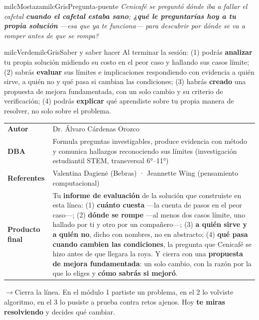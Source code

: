 \documentclass[11pt,letterpaper]{article}
\newcommand{\puente}[1]{%
  \begin{puentebox}%
    \textcolor{milcGradeDark}{$\rightarrow$}\hspace{2mm}#1%
  \end{puentebox}%
}
\begin{document}
\begin{softbox}{milcMostaza}{milcGris}{Pregunta-puente}
\textit{Cenicafé se preguntó dónde iba a fallar el cafetal \textbf{cuando el cafetal estaba sano}; \textbf{¿qué le preguntarías hoy a tu propia solución} ---esa que ya te funciona--- para descubrir por dónde se va a romper antes de que se rompa?}
\end{softbox}

\begin{softbox}{milcVerde}{milcGris}{Saber y saber hacer}
Al terminar la sesión: (1) podrás \textbf{analizar} tu propia solución midiendo su costo en el peor caso y hallando sus casos límite; (2) sabrás \textbf{evaluar} sus límites e implicaciones respondiendo con evidencia a quién sirve, a quién no y qué pasa si cambian las condiciones; (3) habrás \textbf{creado} una propuesta de mejora fundamentada, con un solo cambio y su criterio de verificación; (4) podrás \textbf{explicar} qué aprendiste sobre tu propia manera de resolver, no solo sobre el problema.
\end{softbox}



\small
\begin{tabularx}{\textwidth}{>{\bfseries}p{3.0cm}Y}
Autor & Dr. Álvaro Cárdenas Orozco\\
DBA & Formula preguntas investigables, produce evidencia con método y comunica hallazgos reconociendo sus límites (investigación estudiantil STEM, transversal 6°--11°)\\
Referentes & Valentina Dagienė (Bebras) · Jeannette Wing (pensamiento computacional)\\
Producto final & Tu \textbf{informe de evaluación} de la solución que construiste en esta línea: (1) \textbf{cuánto cuesta} ---la cuenta de pasos en el peor caso---; (2) \textbf{dónde se rompe} ---al menos dos casos límite, uno hallado por ti y otro por un compañero---; (3) \textbf{a quién sirve y a quién no}, dicho con nombres, no en abstracto; (4) \textbf{qué pasa cuando cambien las condiciones}, la pregunta que Cenicafé se hizo antes de que llegara la roya. Y cierra con una \textbf{propuesta de mejora fundamentada}: un solo cambio, con la razón por la que lo eliges y \textbf{cómo sabrás si mejoró}.\\
\end{tabularx}
\normalsize

\puente{Cierra la línea. En el módulo 1 partiste un problema, en el 2 lo volviste algoritmo, en el 3 lo pusiste a prueba contra retos ajenos. Hoy \textbf{te miras resolviendo} y decides qué cambiar.}
\end{document}

